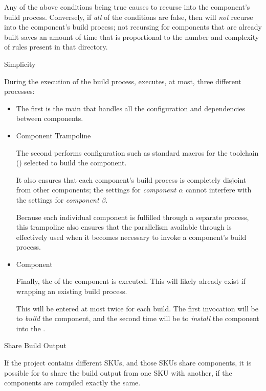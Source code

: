 \begin{description}
  Any of the above conditions being true causes \lmsbw to recurse into
  the component's build process.  Conversely, if \emph{all} of the
  conditions are false, then \lmsbw will \emph{not} recurse into the
  component's build process; not recursing for components that are
  already built saves an amount of time that is proportional to the
  number and complexity of \make rules present in that directory.

\item \makefile Simplicity

  During the execution of the build process, \lmsbw executes, at most,
  three different \makefile processes:

  \begin{itemize}
  \item \lmsbw \makefile

    The first is the main \lmsbw \makefile tbat handles all the
    configuration and dependencies between components.

  \item Component Trampoline \makefile

    The second \makefile performs configuration such as standard
    macros for the toolchain ()
    selected to build the component.

    It also ensures that each component's build process is completely
    disjoint from other components; the settings for \emph{component
      $\alpha$} cannot interfere with the settings for \emph{component
      $\beta$}.

    Because each individual component is fulfilled through a separate
    \make process, this trampoline also ensures that the parallelism
    available through \gnumake is effectively used when it becomes
    necessary to invoke a component's build process.

  \item Component \makefile

    Finally, the \makefile of the component is executed.  This will
    likely already exist if wrapping an existing build process.

    This \makefile will be entered at most twice for each build.  The
    first invocation will be to \emph{build} the component, and the
    second time will be to \emph{install} the component into the
    \destdir.
\end{itemize}

\item Share Build Output

  If the project contains different SKUs, and those SKUs share
  components, it is possible for \lmsbw to share the build output from
  one SKU with another, if the components are compiled exactly the
  same.

\end{description}

